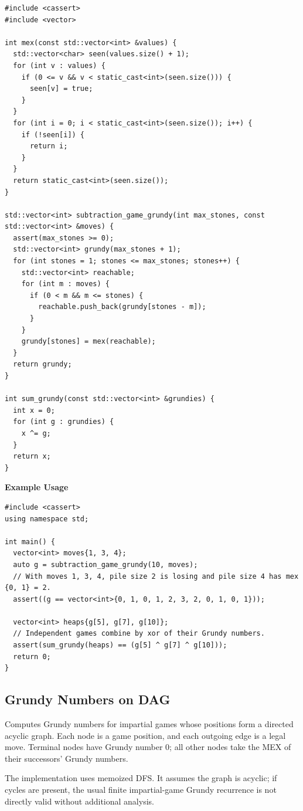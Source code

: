 \begin{lstlisting}[style=cpp]
#include <cassert>
#include <vector>

int mex(const std::vector<int> &values) {
  std::vector<char> seen(values.size() + 1);
  for (int v : values) {
    if (0 <= v && v < static_cast<int>(seen.size())) {
      seen[v] = true;
    }
  }
  for (int i = 0; i < static_cast<int>(seen.size()); i++) {
    if (!seen[i]) {
      return i;
    }
  }
  return static_cast<int>(seen.size());
}

std::vector<int> subtraction_game_grundy(int max_stones, const std::vector<int> &moves) {
  assert(max_stones >= 0);
  std::vector<int> grundy(max_stones + 1);
  for (int stones = 1; stones <= max_stones; stones++) {
    std::vector<int> reachable;
    for (int m : moves) {
      if (0 < m && m <= stones) {
        reachable.push_back(grundy[stones - m]);
      }
    }
    grundy[stones] = mex(reachable);
  }
  return grundy;
}

int sum_grundy(const std::vector<int> &grundies) {
  int x = 0;
  for (int g : grundies) {
    x ^= g;
  }
  return x;
}
\end{lstlisting}
\textbf{Example Usage}\par
\begin{lstlisting}[style=cpp]
#include <cassert>
using namespace std;

int main() {
  vector<int> moves{1, 3, 4};
  auto g = subtraction_game_grundy(10, moves);
  // With moves 1, 3, 4, pile size 2 is losing and pile size 4 has mex {0, 1} = 2.
  assert((g == vector<int>{0, 1, 0, 1, 2, 3, 2, 0, 1, 0, 1}));

  vector<int> heaps{g[5], g[7], g[10]};
  // Independent games combine by xor of their Grundy numbers.
  assert(sum_grundy(heaps) == (g[5] ^ g[7] ^ g[10]));
  return 0;
}
\end{lstlisting}
\subsection{Grundy Numbers on DAG}
\label{sec:6.8.4}
Computes Grundy numbers for impartial games whose positions form a directed acyclic graph. Each node is a game position, and each outgoing edge is a legal move. Terminal nodes have Grundy number $0$; all other nodes take the MEX of their successors' Grundy numbers.

The implementation uses memoized DFS. It assumes the graph is acyclic; if cycles are present, the usual finite impartial-game Grundy recurrence is not directly valid without additional analysis.

